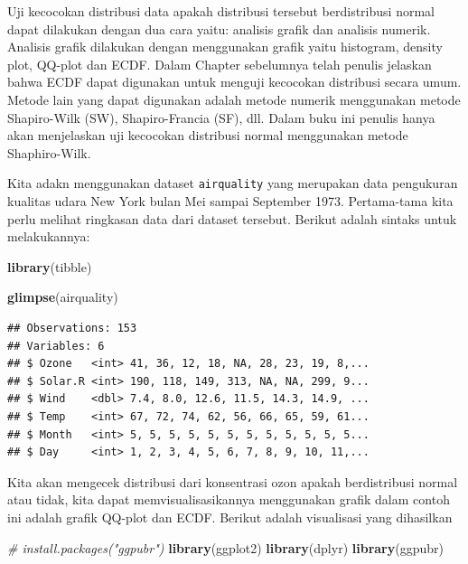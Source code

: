 \documentclass[]{book}
\newenvironment{Shaded}{\begin{snugshade}}{\end{snugshade}}
\newcommand{\KeywordTok}[1]{\textcolor[rgb]{0.13,0.29,0.53}{\textbf{#1}}}
\newcommand{\CommentTok}[1]{\textcolor[rgb]{0.56,0.35,0.01}{\textit{#1}}}
\newcommand{\NormalTok}[1]{#1}
\begin{document}
Uji kecocokan distribusi data apakah distribusi tersebut berdistribusi
normal dapat dilakukan dengan dua cara yaitu: analisis grafik dan
analisis numerik. Analisis grafik dilakukan dengan menggunakan grafik
yaitu histogram, density plot, QQ-plot dan ECDF. Dalam Chapter
sebelumnya telah penulis jelaskan bahwa ECDF dapat digunakan untuk
menguji kecocokan distribusi secara umum. Metode lain yang dapat
digunakan adalah metode numerik menggunakan metode Shapiro-Wilk (SW),
Shapiro-Francia (SF), dll. Dalam buku ini penulis hanya akan menjelaskan
uji kecocokan distribusi normal menggunakan metode Shaphiro-Wilk.

Kita adakn menggunakan dataset \texttt{airquality} yang merupakan data
pengukuran kualitas udara New York bulan Mei sampai September 1973.
Pertama-tama kita perlu melihat ringkasan data dari dataset tersebut.
Berikut adalah sintaks untuk melakukannya:

\begin{Shaded}
\begin{Highlighting}[]
\KeywordTok{library}\NormalTok{(tibble)}
\end{Highlighting}
\end{Shaded}

\begin{Shaded}
\begin{Highlighting}[]
\KeywordTok{glimpse}\NormalTok{(airquality)}
\end{Highlighting}
\end{Shaded}

\begin{verbatim}
## Observations: 153
## Variables: 6
## $ Ozone   <int> 41, 36, 12, 18, NA, 28, 23, 19, 8,...
## $ Solar.R <int> 190, 118, 149, 313, NA, NA, 299, 9...
## $ Wind    <dbl> 7.4, 8.0, 12.6, 11.5, 14.3, 14.9, ...
## $ Temp    <int> 67, 72, 74, 62, 56, 66, 65, 59, 61...
## $ Month   <int> 5, 5, 5, 5, 5, 5, 5, 5, 5, 5, 5, 5...
## $ Day     <int> 1, 2, 3, 4, 5, 6, 7, 8, 9, 10, 11,...
\end{verbatim}

Kita akan mengecek distribusi dari konsentrasi ozon apakah berdistribusi
normal atau tidak, kita dapat memvisualisasikannya menggunakan grafik
dalam contoh ini adalah grafik QQ-plot dan ECDF. Berikut adalah
visualisasi yang dihasilkan

\begin{Shaded}
\begin{Highlighting}[]
\CommentTok{# install.packages("ggpubr")}
\KeywordTok{library}\NormalTok{(ggplot2)}
\KeywordTok{library}\NormalTok{(dplyr)}
\KeywordTok{library}\NormalTok{(ggpubr)}
\end{Highlighting}
\end{Shaded}
\end{document}
